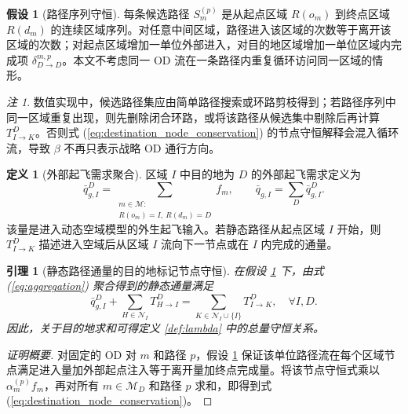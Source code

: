 \documentclass[a4paper,12pt]{article}
\theoremstyle{plain}
\newtheorem{lemma}[theorem]{引理}
\theoremstyle{definition}
\newtheorem{definition}[theorem]{定义}
\newtheorem{assumption}[theorem]{假设}
\theoremstyle{remark}
\newtheorem{remark}[theorem]{注}
\begin{document}
\begin{assumption}[路径序列守恒]\label{asm:path_sequence_conservation}
每条候选路径 $S_m^{(p)}$ 是从起点区域 $R(o_m)$ 到终点区域 $R(d_m)$ 的连续区域序列。对任意中间区域，路径进入该区域的次数等于离开该区域的次数；对起点区域增加一单位外部进入，对目的地区域增加一单位区域内完成项 $\delta_{D\to D}^{m,p}$。本文不考虑同一 OD 流在一条路径内重复循环访问同一区域的情形。
\end{assumption}

\begin{remark}
数值实现中，候选路径集应由简单路径搜索或环路剪枝得到；若路径序列中同一区域重复出现，则先删除闭合环路，或将该路径从候选集中剔除后再计算 $T_{I\to K}^D$。否则式 (\ref{eq:destination_node_conservation}) 的节点守恒解释会混入循环流，导致 $\beta$ 不再只表示战略 OD 通行方向。
\end{remark}

\begin{definition}[外部起飞需求聚合]\label{def:external_departure}
区域 $I$ 中目的地为 $D$ 的外部起飞需求定义为
\begin{equation}\label{eq:external_departure}
    \bar q_{g,I}^D =
    \sum_{\substack{m\in\mathcal M:\\ R(o_m)=I,\ R(d_m)=D}} f_m,
    \qquad
    \bar q_{g,I}=\sum_D \bar q_{g,I}^D .
\end{equation}
该量是进入动态空域模型的外生起飞输入。若静态路径从起点区域 $I$ 开始，则 $T_{I\to K}^D$ 描述进入空域后从区域 $I$ 流向下一节点或在 $I$ 内完成的通量。
\end{definition}

\begin{lemma}[静态路径通量的目的地标记节点守恒]\label{lem:path_flux_conservation}
在假设 \ref{asm:path_sequence_conservation} 下，由式 (\ref{eq:aggregation}) 聚合得到的静态通量满足
\begin{equation}\label{eq:destination_node_conservation}
    \bar q_{g,I}^D+\sum_{H\in\mathcal N_I}T_{H\to I}^D
    =
    \sum_{K\in\mathcal N_I\cup\{I\}}T_{I\to K}^D,
    \quad \forall I,D .
\end{equation}
因此，关于目的地求和可得定义 \ref{def:lambda} 中的总量守恒关系。
\end{lemma}

\begin{proof}[证明概要]
对固定的 OD 对 $m$ 和路径 $p$，假设 \ref{asm:path_sequence_conservation} 保证该单位路径流在每个区域节点满足进入量加外部起点注入等于离开量加终点完成量。将该节点守恒式乘以 $\alpha_m^{(p)}f_m$，再对所有 $m\in\mathcal M_D$ 和路径 $p$ 求和，即得到式 (\ref{eq:destination_node_conservation})。
\end{proof}
\end{document}
